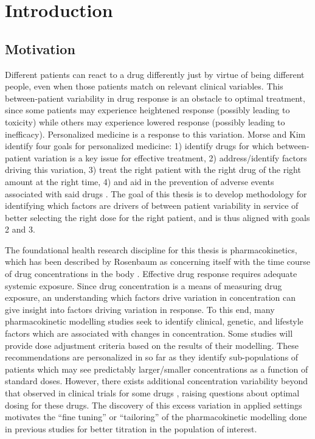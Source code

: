 \chapter{Introduction}

\section{Motivation}

Different patients can react to a drug differently just by virtue of being different people, even when those patients match on relevant clinical variables.  This between-patient variability in drug response is an obstacle to optimal treatment, since some patients may experience heightened response (possibly leading to toxicity) while others may experience lowered response (possibly leading to inefficacy).  Personalized medicine is a response to this variation.  Morse and Kim identify four goals for personalized medicine: 1) identify drugs for which between-patient variation is a key issue for effective treatment,  2) address/identify factors driving this variation, 3) treat the right patient with the right drug  of the right amount at the right time, 4) and aid in the prevention of adverse events associated with said drugs \cite{morse2015personalized}.  The goal of this thesis is to develop methodology for identifying which factors are drivers of between patient variability in service of better selecting the right dose for the right patient, and is thus aligned with goals 2 and 3.

The foundational health research discipline for this thesis is pharmacokinetics, which has been described by Rosenbaum as concerning itself with the time course of drug concentrations in the body \cite{ rosenbaum2016basic}.
Effective drug response requires adequate systemic exposure.  Since drug concentration is a means of measuring drug exposure,  an understanding which factors drive variation in concentration can give insight into factors driving variation in response.  To this end, many pharmacokinetic modelling studies seek to identify clinical, genetic, and lifestyle factors which are associated with changes in concentration. Some studies will provide dose adjustment criteria based on the results of their modelling. These recommendations are personalized in so far as they identify sub-populations of patients which may see predictably larger/smaller concentrations as a function of standard doses. However, there exists additional concentration variability beyond that observed in clinical trials for some drugs \cite{sukumar2019apixaban}, raising questions about optimal dosing for these drugs.  The discovery of this excess variation in applied settings motivates the ``fine tuning'' or ``tailoring'' of the pharmacokinetic modelling done in previous studies for better titration in the population of interest.

